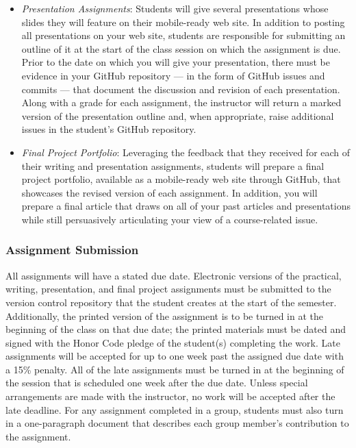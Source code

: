 \begin{itemize}
  \item {\em Presentation Assignments\/}: Students will give several presentations whose slides they will feature on their
    mobile-ready web site. In addition to posting all presentations on your web site, students are responsible for
    submitting an outline of it at the start of the class session on which the assignment is due. Prior to the date on
    which you will give your presentation, there must be evidence in your GitHub repository --- in the form of GitHub
    issues and commits --- that document the discussion and revision of each presentation. Along with a grade for each
    assignment, the instructor will return a marked version of the presentation outline and, when appropriate, raise
    additional issues in the student's GitHub repository.

  \item {\em Final Project Portfolio\/}: Leveraging the feedback that they received for each of their writing and
    presentation assignments, students will prepare a final project portfolio, available as a mobile-ready web site
    through GitHub, that showcases the revised version of each assignment. In addition, you will prepare a final article
    that draws on all of your past articles and presentations while still persuasively articulating your view of a
    course-related issue.

\end{itemize}
\vspace*{-.1in}

\subsubsection*{Assignment Submission}

All assignments will have a stated due date. Electronic versions of the practical, writing, presentation, and final
project assignments must be submitted to the version control repository that the student creates at the start of the
semester. Additionally, the printed version of the assignment is to be turned in at the beginning of the class on that
due date; the printed materials must be dated and signed with the Honor Code pledge of the student(s) completing the
work. Late assignments will be accepted for up to one week past the assigned due date with a 15\% penalty. All of the
late assignments must be turned in at the beginning of the session that is scheduled one week after the due date. Unless
special arrangements are made with the instructor, no work will be accepted after the late deadline. For any assignment
completed in a group, students must also turn in a one-paragraph document that describes each group member's
contribution to the assignment.

